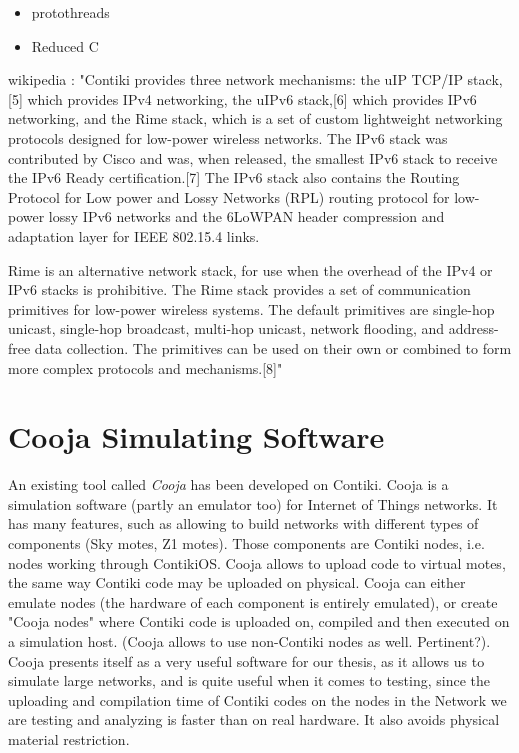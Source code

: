 
\begin{itemize}
\item protothreads
\item Reduced C
\end{itemize}
wikipedia : "Contiki provides three network mechanisms: the uIP TCP/IP stack,[5] which provides IPv4 networking, the uIPv6 stack,[6] which provides IPv6 networking, and the Rime stack, which is a set of custom lightweight networking protocols designed for low-power wireless networks. The IPv6 stack was contributed by Cisco and was, when released, the smallest IPv6 stack to receive the IPv6 Ready certification.[7] The IPv6 stack also contains the Routing Protocol for Low power and Lossy Networks (RPL) routing protocol for low-power lossy IPv6 networks and the 6LoWPAN header compression and adaptation layer for IEEE 802.15.4 links.

Rime is an alternative network stack, for use when the overhead of the IPv4 or IPv6 stacks is prohibitive. The Rime stack provides a set of communication primitives for low-power wireless systems. The default primitives are single-hop unicast, single-hop broadcast, multi-hop unicast, network flooding, and address-free data collection. The primitives can be used on their own or combined to form more complex protocols and mechanisms.[8]"

\section{Cooja Simulating Software}
An existing tool called \textit{Cooja} has been developed on Contiki. Cooja is a simulation software (partly an emulator too) for Internet of Things networks. It has many features, such as allowing to build networks with different types of components (Sky motes, Z1 motes). Those components are Contiki nodes, i.e. nodes working through ContikiOS. Cooja allows to upload code to virtual motes, the same way Contiki code may be uploaded on physical. Cooja can either emulate nodes (the hardware of each component is entirely emulated), or create "Cooja nodes" where Contiki code is uploaded on, compiled and then executed on a simulation host. (Cooja allows to use non-Contiki nodes as well. Pertinent?). Cooja presents itself as a very useful software for our thesis, as it allows us to simulate large networks, and is quite useful when it comes to testing, since the uploading and compilation time of Contiki codes on the nodes in the Network we are testing and analyzing is faster than on real hardware. It also avoids physical material restriction.

